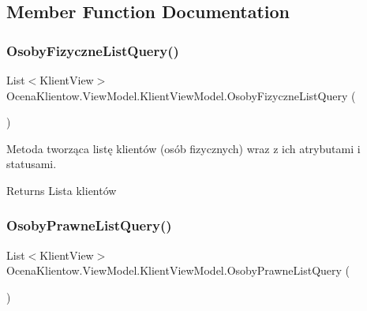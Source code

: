 \subsection{Member Function Documentation}
\hypertarget{class_ocena_klientow_1_1_view_model_1_1_klient_view_model_aa8bae282d6c051d9172f227f6c20f37f}{}\label{class_ocena_klientow_1_1_view_model_1_1_klient_view_model_aa8bae282d6c051d9172f227f6c20f37f} 
\subsubsection{\texorpdfstring{Osoby\+Fizyczne\+List\+Query()}{OsobyFizyczneListQuery()}}
{\footnotesize\ttfamily List$<$Klient\+View$>$ Ocena\+Klientow.\+View\+Model.\+Klient\+View\+Model.\+Osoby\+Fizyczne\+List\+Query (\begin{DoxyParamCaption}{ }\end{DoxyParamCaption})\hspace{0.3cm}{\ttfamily [inline]}}



Metoda tworząca listę klientów (osób fizycznych) wraz z ich atrybutami i statusami. 

\begin{DoxyReturn}{Returns}
Lista klientów
\end{DoxyReturn}
\hypertarget{class_ocena_klientow_1_1_view_model_1_1_klient_view_model_af5204f3b858c00e04d0fcd6192dcb7f7}{}\label{class_ocena_klientow_1_1_view_model_1_1_klient_view_model_af5204f3b858c00e04d0fcd6192dcb7f7} 
\subsubsection{\texorpdfstring{Osoby\+Prawne\+List\+Query()}{OsobyPrawneListQuery()}}
{\footnotesize\ttfamily List$<$Klient\+View$>$ Ocena\+Klientow.\+View\+Model.\+Klient\+View\+Model.\+Osoby\+Prawne\+List\+Query (\begin{DoxyParamCaption}{ }\end{DoxyParamCaption})\hspace{0.3cm}{\ttfamily [inline]}}



